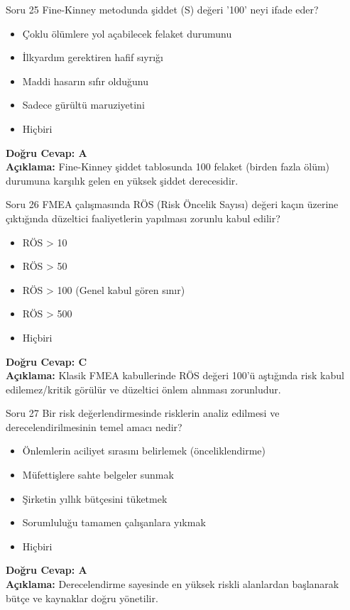 \documentclass[12pt,a4paper]{article}
\begin{document}
\begin{testcard}{Soru 25}
    Fine-Kinney metodunda şiddet (S) değeri '100' neyi ifade eder?
    \begin{itemize}
        \item[A)] Çoklu ölümlere yol açabilecek felaket durumunu
        \item[B)] İlkyardım gerektiren hafif sıyrığı
        \item[C)] Maddi hasarın sıfır olduğunu
        \item[D)] Sadece gürültü maruziyetini
        \item[E)] Hiçbiri
    \end{itemize}
    \tcblower
    \textbf{Doğru Cevap: A} \\
    \textbf{Açıklama:} Fine-Kinney şiddet tablosunda 100 felaket (birden fazla ölüm) durumuna karşılık gelen en yüksek şiddet derecesidir.
\end{testcard}

\begin{testcard}{Soru 26}
    FMEA çalışmasında RÖS (Risk Öncelik Sayısı) değeri kaçın üzerine çıktığında düzeltici faaliyetlerin yapılması zorunlu kabul edilir?
    \begin{itemize}
        \item[A)] RÖS > 10
        \item[B)] RÖS > 50
        \item[C)] RÖS > 100 (Genel kabul gören sınır)
        \item[D)] RÖS > 500
        \item[E)] Hiçbiri
    \end{itemize}
    \tcblower
    \textbf{Doğru Cevap: C} \\
    \textbf{Açıklama:} Klasik FMEA kabullerinde RÖS değeri 100'ü aştığında risk kabul edilemez/kritik görülür ve düzeltici önlem alınması zorunludur.
\end{testcard}

\begin{testcard}{Soru 27}
    Bir risk değerlendirmesinde risklerin analiz edilmesi ve derecelendirilmesinin temel amacı nedir?
    \begin{itemize}
        \item[A)] Önlemlerin aciliyet sırasını belirlemek (önceliklendirme)
        \item[B)] Müfettişlere sahte belgeler sunmak
        \item[C)] Şirketin yıllık bütçesini tüketmek
        \item[D)] Sorumluluğu tamamen çalışanlara yıkmak
        \item[E)] Hiçbiri
    \end{itemize}
    \tcblower
    \textbf{Doğru Cevap: A} \\
    \textbf{Açıklama:} Derecelendirme sayesinde en yüksek riskli alanlardan başlanarak bütçe ve kaynaklar doğru yönetilir.
\end{testcard}
\end{document}
